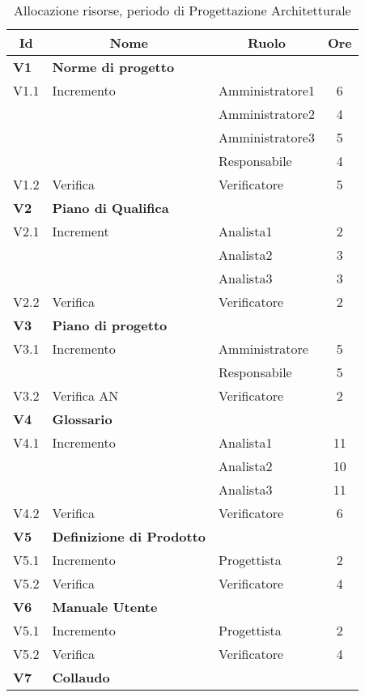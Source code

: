 \begin{table}[H]
	\centering
	\begin{tabular*}{1\textwidth}{ @{\extracolsep{\fill} } l l l c  }
	\hline
	\multicolumn{1}{c}{\textbf{Id}} & 
	\multicolumn{1}{c}{\textbf{Nome}} & 
	\multicolumn{1}{c}{\textbf{Ruolo}}& 
	\multicolumn{1}{c}{\textbf{Ore}} \\
	\hline
	
	\textbf{V1} & \textbf{Norme di progetto} \\
	\cline{3-4}
	V1.1 & Incremento & Amministratore1 & 6\\ 
    & & Amministratore2 & 4\\
    & & Amministratore3 & 5 \\
    & & Responsabile & 4 \\
    \cline{3-4}
	V1.2 & Verifica & Verificatore &  5\\
	
	\hline
	\textbf{V2} & \textbf{Piano di Qualifica} \\
	\cline{3-4}
	V2.1 & Increment & Analista1 & 2\\ 
    & & Analista2 & 3\\
    & & Analista3 & 3 \\
    \cline{3-4}
	V2.2 & Verifica & Verificatore &  2\\
	
	\hline
	\textbf{V3} & \textbf{Piano di progetto} \\
	\cline{3-4}
	V3.1 & Incremento & Amministratore & 5\\ 
    & & Responsabile & 5\\
    \cline{3-4}
	V3.2 & Verifica AN & Verificatore &  2\\

	\hline
	\textbf{V4} & \textbf{Glossario} \\
	\cline{3-4}
	V4.1 & Incremento & Analista1 & 11\\ 
    & & Analista2 & 10\\
    & & Analista3 & 11\\
    \cline{3-4}
	V4.2 & Verifica & Verificatore &  6\\

        \hline
        \textbf{V5} & \textbf{Definizione di Prodotto} \\
	\cline{3-4}
        V5.1 & Incremento & Progettista & 2\\
        \cline{3-4}
	V5.2 & Verifica & Verificatore &  4\\

        \hline
        \textbf{V6} & \textbf{Manuale Utente} \\
	\cline{3-4}
        V5.1 & Incremento & Progettista & 2\\
        \cline{3-4}
	V5.2 & Verifica & Verificatore &  4\\

                \hline
        \textbf{V7} & \textbf{Collaudo} \\


        \hline
	\end{tabular*}
        \caption{Allocazione risorse, periodo di Progettazione Architetturale}
	\end{table}
